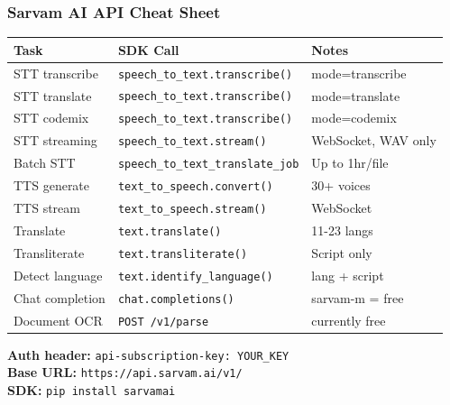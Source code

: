 \begin{frame}[fragile]\frametitle{Sarvam AI API Cheat Sheet}
\begin{center}
\begin{tabular}{|p{2cm}|p{3.2cm}|p{2cm}|}
\hline
\textbf{Task} & \textbf{SDK Call} & \textbf{Notes} \\
\hline
STT transcribe & \texttt{speech\_to\_text.transcribe()} & mode=transcribe \\
STT translate & \texttt{speech\_to\_text.transcribe()} & mode=translate \\
STT codemix & \texttt{speech\_to\_text.transcribe()} & mode=codemix \\
STT streaming & \texttt{speech\_to\_text.stream()} & WebSocket, WAV only \\
Batch STT & \texttt{speech\_to\_text\_translate\_job} & Up to 1hr/file \\
TTS generate & \texttt{text\_to\_speech.convert()} & 30+ voices \\
TTS stream & \texttt{text\_to\_speech.stream()} & WebSocket \\
Translate & \texttt{text.translate()} & 11-23 langs \\
Transliterate & \texttt{text.transliterate()} & Script only \\
Detect language & \texttt{text.identify\_language()} & lang + script \\
Chat completion & \texttt{chat.completions()} & sarvam-m = free \\
Document OCR & \texttt{POST /v1/parse} & currently free \\
\hline
\end{tabular}
\end{center}

\textbf{Auth header:} \texttt{api-subscription-key: YOUR\_KEY}\\
\textbf{Base URL:} \texttt{https://api.sarvam.ai/v1/}\\
\textbf{SDK:} \lstinline|pip install sarvamai|
\end{frame}

